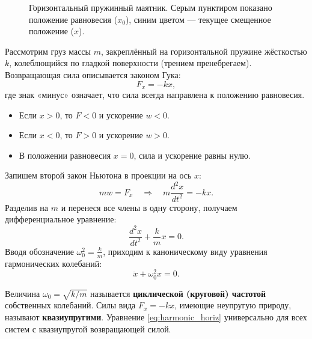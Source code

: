 \begin{figure}[htbp]
    \caption{Горизонтальный пружинный маятник. Серым пунктиром показано положение равновесия ($x_0$), синим цветом — текущее смещенное положение ($x$).}
    \label{fig:spring_horizontal}
\end{figure}

\begin{theorem}
Рассмотрим груз массы $m$, закреплённый на горизонтальной пружине жёсткостью $k$, колеблющийся по гладкой поверхности (трением пренебрегаем). Возвращающая сила описывается законом Гука:
\begin{equation}
    F_x = -kx,
\end{equation}
где знак «минус» означает, что сила всегда направлена к положению равновесия.
\begin{itemize}
    \item Если $x > 0$, то $F < 0$ и ускорение $w < 0$.
    \item Если $x < 0$, то $F > 0$ и ускорение $w > 0$.
    \item В положении равновесия $x = 0$, сила и ускорение равны нулю.
\end{itemize}

Запишем второй закон Ньютона в проекции на ось $x$:
\begin{equation}
    m w = F_x \quad \Rightarrow \quad m \frac{d^2x}{dt^2} = -kx.
\end{equation}
Разделив на $m$ и перенеся все члены в одну сторону, получаем дифференциальное уравнение:
\begin{equation}
    \frac{d^2x}{dt^2} + \frac{k}{m}x = 0.
\end{equation}
Вводя обозначение $\omega_0^2 = \frac{k}{m}$, приходим к каноническому виду уравнения гармонических колебаний:
\begin{equation}
    \ddot{x} + \omega_0^2 x = 0. \label{eq:harmonic_horiz}
\end{equation}
\end{theorem}

\begin{remark}
Величина $\omega_0 = \sqrt{k/m}$ называется \textbf{циклической (круговой) частотой} собственных колебаний. Силы вида $F_x = -kx$, имеющие неупругую природу, называют \textbf{квазиупругими}. Уравнение \eqref{eq:harmonic_horiz} универсально для всех систем с квазиупругой возвращающей силой.
\end{remark}
